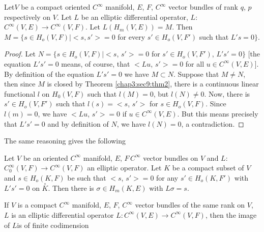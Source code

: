 \begin{proposition}\label{chap3:sec9:prop2} %
  Let\pageoriginale $V$ be a compact oriented $C^{\infty}$ manifold, $E$, $F$,
  $C^{\infty}$ vector bundles of rank $q$, $p$ respectively on
  $V$. Let $L$ be an elliptic differential operator, $L$: $C^{\infty}
  (V, E) \to C^{\infty} (V, F)$. Let $L (H_m (V, E)) = M$. Then $M =
  \{ s \in H_o (V, F) | <s, s'> = 0$ for every  $s' \in H_o (V,
  F')$ such that  $L' s = 0 \}$. 
\end{proposition}

\begin{proof}
  Let $N = \{ s \in H_o (V, F) | <s$, $s'> = 0$ for $s' \in H_o (V,
  F')$, $L' s' =0 \}$ [the equation $L' s' = 0$ means, of course, that
    $<Lu$, $s'> =0$ for all $u \in C^{\infty} (V, E)$]. By definition
  of the equation $L' s' = 0$ we have $M \subset N$. Suppose that $M
  \neq N$, then since $M$ is closed by Theorem \ref{chap3:sec9:thm2}, there is a
  continuous linear functional $l$ on $H_0 (V, F)$ such that $l (M) =
  0$, but $l (N)\neq 0$. Now, there is $s' \in H_o (V,F')$ such that
  $l(s) = <s$, $s'>$ for $s \in H_o (V, F)$. Since $l(m) =0$, we have
  $<Lu$, $s'> =0$ if $u \in C^{\infty}(V, E)$. But this means
  precisely that $L' s' =0$ and by definition of $N$, we have $l(N)
  =0$, a contradiction. 
\end{proof}

The same reasoning gives the following

\begin{prop*}[{\boldmath $2'$}]\label{chap3:sec9:prop3'} %
  Let $V$ be an oriented $C^{\infty}$ manifold, $E$, $F\, C^{\infty}$
  vector bundles on $V$ and $L$: $C^{\infty}_0 (V, F) \to C^{\infty}
  (V, F)$ an elliptic operator. Let $K$ be a compact subset of $V$ and
  $s \in H_o (K, F)$ be such that $<s$, $s'> = 0$ for any $s' \in H_o
  (K, F')$ with $L' s' = 0$ on $\overset{\circ}{K}$. Then there is
  $\sigma \in H_m (K, E)$ with $L \sigma = s$. 
\end{prop*}

\begin{proposition}\label{chap3:sec9:prop3} %
  If $V$ is a compact $C^{\infty}$ manifold, $E$, $F$, $C^{\infty}$
  vector bundles of the same rank on $V$, $L$ is an elliptic
  differential operator $L: C^{\infty} (V, E) \to C^{\infty} (V,F)$,
  then the image of $L$is of finite codimension 
\end{proposition}


